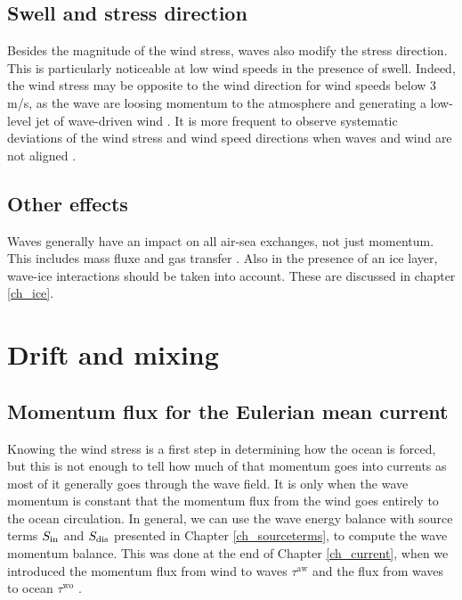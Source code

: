 \subsection{Swell and stress direction}
Besides the magnitude of the wind stress, waves also modify the stress direction. This is particularly noticeable at low wind speeds in the presence of swell. Indeed, the wind stress may be opposite to the wind direction for wind speeds below 3 m/s, as the wave are loosing momentum to the atmosphere and generating a low-level jet of wave-driven wind \citep{Semedo&al.2009,Hogstrom&al.2009}. It is more frequent to observe systematic deviations of the wind stress and wind speed directions when waves and wind are not aligned \citep{Potter&al.2015}. 

\subsection{Other effects}
Waves generally have an impact on all air-sea exchanges, not just momentum. This includes mass fluxe \citep[see][ for a recent review of spray generation]{Veron2015} and gas transfer \citep[e.g.][]{Brumer&al.2017b}. Also in the presence of an ice layer, wave-ice interactions should be taken into account. These are discussed in chapter \ref{ch_ice}. 

\section{Drift and mixing}
\subsection{Momentum flux for the Eulerian mean current}
Knowing the wind stress is a first step in determining how the ocean is forced, but this is not enough to tell how much of that momentum goes into currents as most of it generally goes through the wave field. It is only when the wave momentum is constant that the momentum flux from the wind goes entirely to the ocean circulation. In general, we can use the wave energy balance with source terms $S_{\rm in}$ and $S_{\rm dis}$ presented in Chapter \ref{ch_sourceterms}, to compute the wave momentum balance. This was done at the end of Chapter \ref{ch_current}, when we introduced the momentum flux from wind to waves $\tau^{\mathrm{aw}}$ and the flux from waves to ocean $\tau^{\mathrm{wo}}$ .

